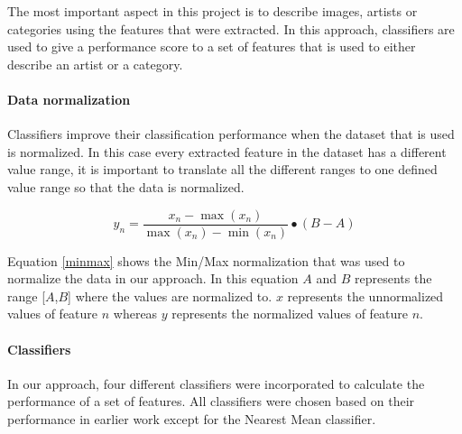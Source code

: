 
The most important aspect in this project is to describe images, artists or categories using the features that were extracted.
In this approach, classifiers are used to give a performance score to a set of features that is used to either describe an artist or a category.

\paragraph{Data normalization}

Classifiers improve their classification performance when the dataset that is used is normalized.
In this case every extracted feature in the dataset has a different value range, it is important to translate all the different ranges to one defined value range so that the data is normalized.

\begin{equation}
\label{minmax}
y_n=\frac{x_n - \max(x_n)}{\max(x_n)-\min(x_n)} \bullet (B-A)
\end{equation}

Equation \ref{minmax} shows the Min/Max normalization that was used to normalize the data in our approach.
In this equation $A$ and $B$ represents the range [$A$,$B$] where the values are normalized to.
$x$ represents the unnormalized values of feature $n$ whereas $y$ represents the normalized values of feature $n$.

\paragraph{Classifiers}
In our approach, four different classifiers were incorporated to calculate the performance of a set of features.
All classifiers were chosen based on their performance in earlier work except for the Nearest Mean classifier.

